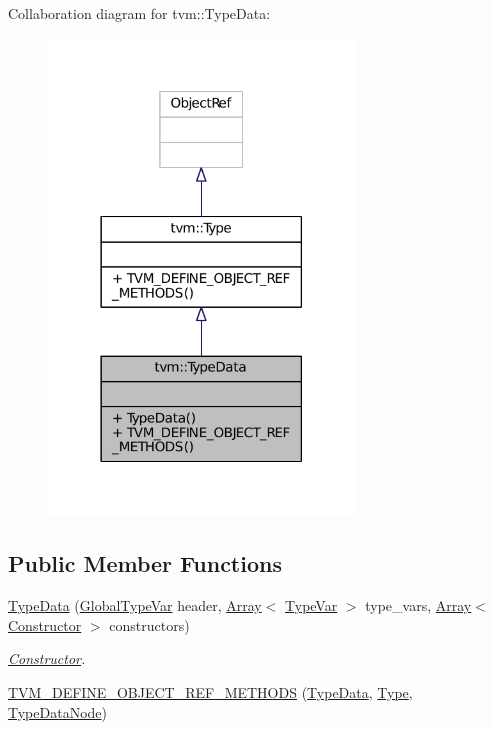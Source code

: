 Collaboration diagram for tvm\+:\+:Type\+Data\+:
\nopagebreak
\begin{figure}[H]
\begin{center}
\leavevmode
\includegraphics[width=230pt]{classtvm_1_1TypeData__coll__graph}
\end{center}
\end{figure}
\subsection*{Public Member Functions}
\begin{DoxyCompactItemize}
\item 
\hyperlink{classtvm_1_1TypeData_a0a98fd1095812379d2bd1337db1511c1}{Type\+Data} (\hyperlink{classtvm_1_1GlobalTypeVar}{Global\+Type\+Var} header, \hyperlink{classtvm_1_1Array}{Array}$<$ \hyperlink{classtvm_1_1TypeVar}{Type\+Var} $>$ type\+\_\+vars, \hyperlink{classtvm_1_1Array}{Array}$<$ \hyperlink{classtvm_1_1Constructor}{Constructor} $>$ constructors)
\begin{DoxyCompactList}\small\item\em \hyperlink{classtvm_1_1Constructor}{Constructor}. \end{DoxyCompactList}\item 
\hyperlink{classtvm_1_1TypeData_aad5f3e2c63355439338b08a806e9e448}{T\+V\+M\+\_\+\+D\+E\+F\+I\+N\+E\+\_\+\+O\+B\+J\+E\+C\+T\+\_\+\+R\+E\+F\+\_\+\+M\+E\+T\+H\+O\+DS} (\hyperlink{classtvm_1_1TypeData}{Type\+Data}, \hyperlink{classtvm_1_1Type}{Type}, \hyperlink{classtvm_1_1TypeDataNode}{Type\+Data\+Node})
\end{DoxyCompactItemize}


